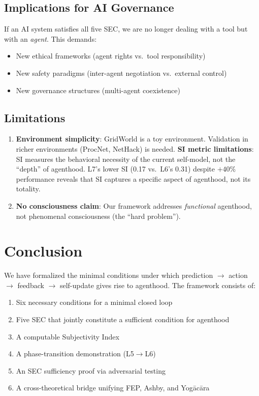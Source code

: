 \documentclass[11pt,a4paper]{article}
\begin{document}
\subsection{Implications for AI Governance}

If an AI system satisfies all five SEC, we are no longer dealing with a tool but with an \emph{agent}. This demands:
\begin{itemize}
    \item New ethical frameworks (agent rights vs.~tool responsibility)
    \item New safety paradigms (inter-agent negotiation vs.~external control)
    \item New governance structures (multi-agent coexistence)
\end{itemize}

\subsection{Limitations}

\begin{enumerate}
    \item \textbf{Environment simplicity}: GridWorld is a toy environment. Validation in richer environments (ProcNet, NetHack) is needed.
    \textbf{SI metric limitations}: SI measures the behavioral necessity of the current self-model, not the ``depth'' of agenthood. L7's lower SI (0.17 vs.~L6's 0.31) despite $+40\%$ performance reveals that SI captures a specific aspect of agenthood, not its totality.
    \item \textbf{No consciousness claim}: Our framework addresses \emph{functional} agenthood, not phenomenal consciousness (the ``hard problem'').
\end{enumerate}

\section{Conclusion}

We have formalized the minimal conditions under which prediction $\to$ action $\to$ feedback $\to$ self-update gives rise to agenthood. The framework consists of:

\begin{enumerate}
    \item Six necessary conditions for a minimal closed loop
    \item Five SEC that jointly constitute a sufficient condition for agenthood
    \item A computable Subjectivity Index
    \item A phase-transition demonstration (L5$\to$L6)
    \item An SEC sufficiency proof via adversarial testing
    \item A cross-theoretical bridge unifying FEP, Ashby, and Yog\={a}c\={a}ra
\end{enumerate}
\end{document}
